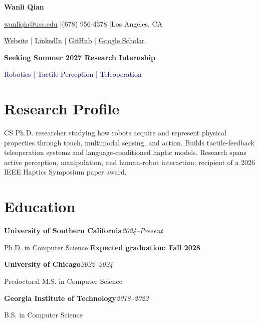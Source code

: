 \documentclass[11pt,letterpaper]{article}
\newcommand{\role}[2]{\textbf{#1}\hfill\textit{#2}\par}
\begin{document}
\fontsize{10.5}{12.4}\selectfont
{\fontsize{24}{27}\selectfont\textbf{Wanli Qian}}\par
\vspace{3pt}
\href{mailto:wanliqia@usc.edu}{wanliqia@usc.edu} \enspace|\enspace (678) 956-4378 \enspace|\enspace Los Angeles, CA\par
\href{https://silverwings-zero.github.io/}{Website} \enspace|\enspace
\href{https://www.linkedin.com/in/wanli-qian-7bb399192/}{LinkedIn} \enspace|\enspace
\href{https://github.com/silverwings-zero}{GitHub} \enspace|\enspace
\href{https://scholar.google.com/citations?user=azFoAIkAAAAJ&hl=en}{Google Scholar}\par
\vspace{4pt}
\textbf{Seeking Summer 2027 Research Internship}\par
\textcolor{navy}{Robotics | Tactile Perception | Teleoperation}\par
\section*{Research Profile}
CS Ph.D. researcher studying how robots acquire and represent physical properties through touch, multimodal sensing, and action. Builds tactile-feedback teleoperation systems and language-conditioned haptic models. Research spans active perception, manipulation, and human-robot interaction; recipient of a 2026 IEEE Haptics Symposium paper award.\par

\section*{Education}
\role{University of Southern California}{2024--Present}
Ph.D. in Computer Science \hfill \textbf{Expected graduation: Fall 2028}\par
\vspace{3pt}
\role{University of Chicago}{2022--2024}
Predoctoral M.S. in Computer Science\par
\vspace{3pt}
\role{Georgia Institute of Technology}{2018--2022}
B.S. in Computer Science\par
\end{document}
